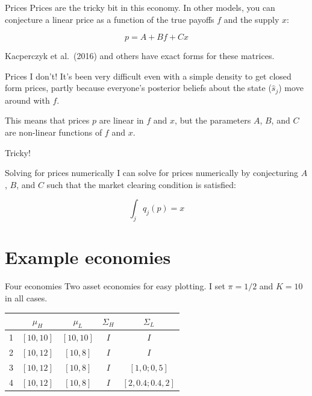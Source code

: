 \documentclass[
  ignorenonframetext,
]{beamer}
\begin{document}
\begin{frame}{Prices}
\protect\hypertarget{prices}{}
Prices are the tricky bit in this economy. In other models, you can
conjecture a linear price as a function of the true payoffs \(f\) and
the supply \(x\):

\[
p = A + B f + C x
\]

Kacperczyk et al.~(2016) and others have exact forms for these matrices.
\end{frame}

\begin{frame}{Prices}
\protect\hypertarget{prices-1}{}
I don't! It's been very difficult even with a simple density to get
closed form prices, partly because everyone's posterior beliefs about
the state (\(\hat s_j\)) move around with \(f\).

This means that prices \(p\) are linear in \(f\) and \(x\), but the
parameters \(A\), \(B\), and \(C\) are non-linear functions of \(f\) and
\(x\).

Tricky!
\end{frame}

\begin{frame}{Solving for prices numerically}
\protect\hypertarget{solving-for-prices-numerically}{}
I can solve for prices numerically by conjecturing \(A\), \(B\), and
\(C\) such that the market clearing condition is satisfied:

\[
\int_j q_j(p) = x
\]
\end{frame}

\hypertarget{example-economies}{%
\section{Example economies}\label{example-economies}}

\begin{frame}{Four economies}
\protect\hypertarget{four-economies}{}
Two asset economies for easy plotting. I set \(\pi = 1/2\) and \(K=10\)
in all cases.

\begin{table}
\begin{tabular}{ccccc}
  \toprule
  & $\mu_H$ & $\mu_L$ & $\Sigma_H$ & $\Sigma_L$ \\
  \midrule
  1 & $[10,10]$ & $[10,10]$ & $I$ & $I$ \\
  2 & $[10,12]$ & $[10,8]$ & $I$ & $I$ \\
  3 & $[10,12]$ & $[10,8]$ & $I$ & $[1, 0; 0, 5]$ \\
  4 & $[10,12]$ & $[10,8]$ & $I$ & $[2, 0.4; 0.4, 2]$ \\
\end{tabular}
\end{table}
\end{frame}
\end{document}
